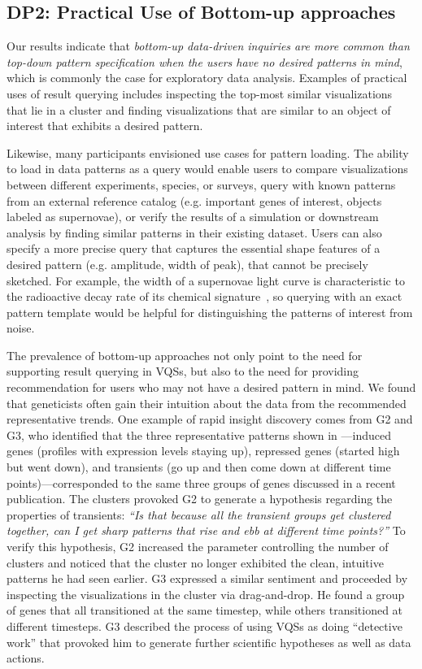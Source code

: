\subsection{DP2: Practical Use of Bottom-up approaches}
\par Our results indicate that \emph{bottom-up data-driven inquiries are more common than top-down pattern specification when the users have no desired patterns in mind}, which is commonly the case for exploratory data analysis. Examples of practical uses of result querying includes inspecting the top-most similar visualizations that lie in a cluster and finding visualizations that are similar to an object of interest that exhibits a desired pattern.
\par Likewise, many participants envisioned use cases for pattern loading. The ability to load in data patterns as a query would enable users to compare visualizations between different experiments, species, or surveys, query with known patterns from an external reference catalog (e.g. important genes of interest, objects labeled as supernovae), or verify the results of a simulation or downstream analysis by finding similar patterns in their existing dataset. Users can also specify a more precise query that captures the essential shape features of a desired pattern (e.g. amplitude, width of peak), that cannot be precisely sketched. For example, the width of a supernovae light curve is characteristic to the radioactive decay rate of its chemical signature~\cite{Nugent1997}, so querying with an exact pattern template would be helpful for distinguishing the patterns of interest from noise.
\par The prevalence of bottom-up approaches not only point to the need for supporting result querying in VQSs, but also to the need for providing recommendation for users who may not have a desired pattern in mind. We found that geneticists often gain their intuition about the data from the recommended representative trends. One example of rapid insight discovery comes from G2 and G3, who identified that the three representative patterns shown in \zv---induced genes (profiles with expression levels staying up), repressed genes (started high but went down), and transients (go up and then come down at different time points)---corresponded to the same three groups of genes discussed in a recent publication\cite{Gloss2017}. The clusters provoked G2 to generate a hypothesis regarding the properties of transients: \textit{``Is that because all the transient groups get clustered together, can I get sharp patterns that rise and ebb at different time points?''} To verify this hypothesis, G2 increased the parameter controlling the number of clusters and noticed that the cluster no longer exhibited the clean, intuitive patterns he had seen earlier. G3 expressed a similar sentiment and proceeded by inspecting the visualizations in the cluster via drag-and-drop. He found a group of genes that all transitioned at the same timestep, while others transitioned at different timesteps. G3 described the process of using VQSs as doing ``detective work'' that provoked him to generate further scientific hypotheses as well as data actions.
